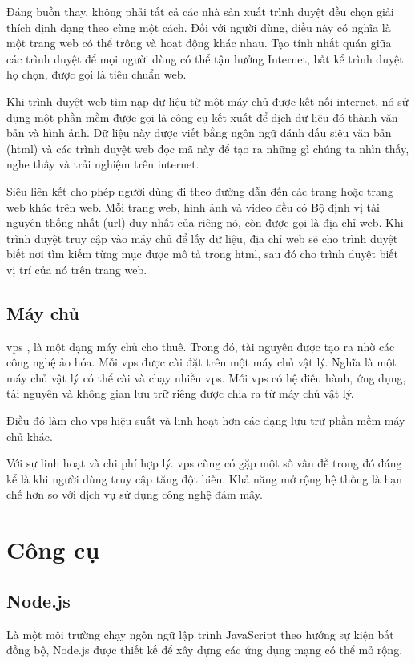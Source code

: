 	Đáng buồn thay, không phải tất cả các nhà sản xuất trình duyệt đều chọn giải thích định dạng theo cùng một cách. Đối với người dùng, điều này có nghĩa là một trang web có thể trông và hoạt động khác nhau. Tạo tính nhất quán giữa các trình duyệt để mọi người dùng có thể tận hưởng Internet, bất kể trình duyệt họ chọn, được gọi là tiêu chuẩn web.
	
	Khi trình duyệt web tìm nạp dữ liệu từ một máy chủ được kết nối internet, nó sử dụng một phần mềm được gọi là công cụ kết xuất để dịch dữ liệu đó thành văn bản và hình ảnh. Dữ liệu này được viết bằng ngôn ngữ đánh dấu siêu văn bản (\acrshort{html}) và các trình duyệt web đọc mã này để tạo ra những gì chúng ta nhìn thấy, nghe thấy và trải nghiệm trên internet.
	
	Siêu liên kết cho phép người dùng đi theo đường dẫn đến các trang hoặc trang web khác trên web. Mỗi trang web, hình ảnh và video đều có Bộ định vị tài nguyên thống nhất (\acrshort{url}) duy nhất của riêng nó, còn được gọi là địa chỉ web. Khi trình duyệt truy cập vào máy chủ để lấy dữ liệu, địa chỉ web sẽ cho trình duyệt biết nơi tìm kiếm từng mục được mô tả trong \acrshort{html}, sau đó cho trình duyệt biết vị trí của nó trên trang web.
	
	\subsection{Máy chủ} \label{subsection:webserver}
	
	\acrshort{vps} \cite{vps:what}, là một dạng máy chủ cho thuê. Trong đó, tài nguyên được tạo ra nhờ các công nghệ ảo hóa. Mỗi \acrshort{vps} được cài đặt trên một máy chủ vật lý. Nghĩa là một máy chủ vật lý có thể cài và chạy nhiều \acrshort{vps}. Mỗi \acrshort{vps} có hệ điều hành, ứng dụng, tài nguyên và không gian lưu trữ riêng được chia ra từ máy chủ vật lý.
	
	Điều đó làm cho \acrshort{vps} hiệu suất và linh hoạt hơn các dạng lưu trữ phần mềm máy chủ khác.
	
	Với sự linh hoạt và chi phí hợp lý. \acrshort{vps} cũng có gặp một số vấn đề trong đó đáng kể là khi người dùng truy cập tăng đột biến. Khả năng mở rộng hệ thống là hạn chế hơn so với dịch vụ sử dụng công nghệ đám mây. 
	
	\section{Công cụ}
	
	\subsection{Node.js}
	Là một môi trường chạy ngôn ngữ lập trình JavaScript theo hướng sự kiện bất đồng bộ, Node.js \cite{nodejs} được thiết kế để xây dựng các ứng dụng mạng có thể mở rộng.
	
